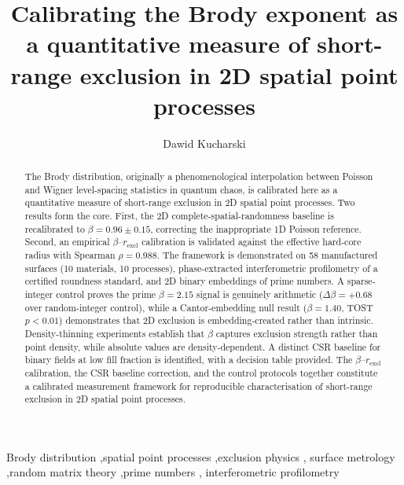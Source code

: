 \documentclass[final,1p,times]{elsarticle}
\theoremstyle{definition}
\begin{document}
\begin{frontmatter}

\title{Calibrating the Brody exponent as a quantitative measure
of short-range exclusion in 2D spatial point processes}

\author[put]{Dawid Kucharski}

\begin{abstract}
The Brody distribution, originally a phenomenological interpolation
between Poisson and Wigner level-spacing statistics in quantum chaos,
is calibrated here as a quantitative measure of short-range exclusion
in 2D spatial point processes. Two results form the core. First, the
2D complete-spatial-randomness baseline is recalibrated to
$\beta=0.96\pm0.15$, correcting the inappropriate 1D Poisson reference.
Second, an empirical $\beta$--$r_{\text{excl}}$ calibration is
validated against the effective hard-core radius with Spearman
$\rho=0.988$. The framework is demonstrated on 58 manufactured
surfaces (10 materials, 10 processes), phase-extracted
interferometric profilometry of a certified roundness standard,
and 2D binary embeddings of prime numbers. A sparse-integer control
proves the prime $\beta=2.15$ signal is genuinely arithmetic
($\Delta\beta=+0.68$ over random-integer control), while a
Cantor-embedding null result ($\beta=1.40$, TOST $p<0.01$)
demonstrates that 2D exclusion is embedding-created rather than
intrinsic. Density-thinning experiments establish that $\beta$
captures exclusion strength rather than point density, while absolute
values are density-dependent. A distinct CSR baseline for binary
fields at low fill fraction is identified, with a decision table
provided. The $\beta$--$r_{\text{excl}}$ calibration, the CSR
baseline correction, and the control protocols together constitute
a calibrated measurement framework for reproducible characterisation
of short-range exclusion in 2D spatial point processes.
\end{abstract}

\begin{keyword}
Brody distribution \sep spatial point processes \sep exclusion physics \sep
surface metrology \sep random matrix theory \sep prime numbers \sep
interferometric profilometry
\end{keyword}

\end{frontmatter}
\end{document}
